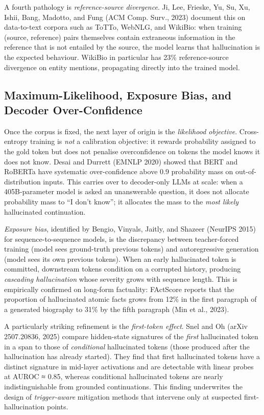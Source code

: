 A fourth pathology is \emph{reference-source divergence}. Ji, Lee, Frieske, Yu, Su, Xu, Ishii, Bang, Madotto, and Fung (ACM Comp. Surv., 2023) document this on data-to-text corpora such as ToTTo, WebNLG, and WikiBio: when training (source, reference) pairs themselves contain extraneous information in the reference that is not entailed by the source, the model learns that hallucination is the expected behaviour. WikiBio in particular has 23\% reference-source divergence on entity mentions, propagating directly into the trained model.

\subsection{Maximum-Likelihood, Exposure Bias, and Decoder Over-Confidence}\label{maximum-likelihood-exposure-bias-and-decoder-over-confidence}

Once the corpus is fixed, the next layer of origin is the \emph{likelihood objective}. Cross-entropy training is \emph{not} a calibration objective: it rewards probability assigned to the gold token but does not penalise overconfidence on tokens the model knows it does not know. Desai and Durrett (EMNLP 2020) showed that BERT and RoBERTa have systematic over-confidence above 0.9 probability mass on out-of-distribution inputs. This carries over to decoder-only LLMs at scale: when a 405B-parameter model is asked an unanswerable question, it does not allocate probability mass to ``I don't know''; it allocates the mass to the \emph{most likely} hallucinated continuation.

\emph{Exposure bias}, identified by Bengio, Vinyals, Jaitly, and Shazeer (NeurIPS 2015) for sequence-to-sequence models, is the discrepancy between teacher-forced training (model sees ground-truth previous tokens) and autoregressive generation (model sees its own previous tokens). When an early hallucinated token is committed, downstream tokens condition on a corrupted history, producing \emph{cascading hallucination} whose severity grows with sequence length. This is empirically confirmed on long-form factuality: FActScore reports that the proportion of hallucinated atomic facts grows from 12\% in the first paragraph of a generated biography to 31\% by the fifth paragraph (Min et al., 2023).

A particularly striking refinement is the \emph{first-token effect}. Snel and Oh (arXiv 2507.20836, 2025) compare hidden-state signatures of the \emph{first} hallucinated token in a span to those of \emph{conditional} hallucinated tokens (those produced after the hallucination has already started). They find that first hallucinated tokens have a distinct signature in mid-layer activations and are detectable with linear probes at AUROC ≈ 0.85, whereas conditional hallucinated tokens are nearly indistinguishable from grounded continuations. This finding underwrites the design of \emph{trigger-aware} mitigation methods that intervene only at suspected first-hallucination points.

